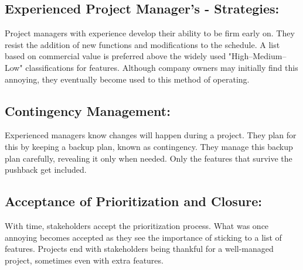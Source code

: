\documentclass[12pt]{article}
\begin{document}
\subsection{Experienced Project Manager's - Strategies:}Project managers with experience develop their ability to be firm early on. They resist the addition of new functions and modifications to the schedule. A list based on commercial value is preferred above the widely used "High–Medium–Low" classifications for features. Although company owners may initially find this annoying, they eventually become used to this method of operating.
\subsection{Contingency Management: }Experienced managers know changes will happen during a project. They plan for this by keeping a backup plan, known as contingency. They manage this backup plan carefully, revealing it only when needed. Only the features that survive the pushback get included.
\subsection{Acceptance of Prioritization and Closure:}With time, stakeholders accept the prioritization process. What was once annoying becomes accepted as they see the importance of sticking to a list of features. Projects end with stakeholders being thankful for a well-managed project, sometimes even with extra features.
\end{document}
